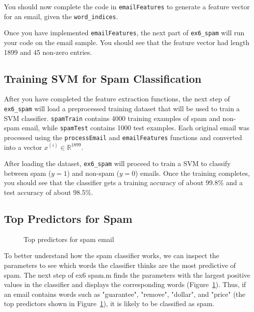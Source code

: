 \documentclass[12pt]{article}
\begin{document}
You should now complete the code in \texttt{emailFeatures} to generate a feature vector for an email, given the \texttt{word\_indices}.

Once you have implemented \texttt{emailFeatures}, the next part of \texttt{ex6\_spam} will run your code on the email sample. You should see that the feature vector had length 1899 and 45 non-zero entries.

\subsection{Training SVM for Spam Classification}

After you have completed the feature extraction functions, the next step of \texttt{ex6\_spam} will load a preprocessed training dataset that will be used to train a SVM classifier. \texttt{spamTrain} contains 4000 training examples of spam and non-spam email, while \texttt{spamTest} contains 1000 test examples. Each original email was processed using the \texttt{processEmail} and \texttt{emailFeatures} functions and converted into a vector $x^{(i)} \in \mathbb{R}^{1899}$.

After loading the dataset, \texttt{ex6\_spam} will proceed to train a SVM to classify between spam ($y = 1$) and non-spam ($y = 0$) emails. Once the training completes, you should see that the classifier gets a training accuracy of about 99.8\% and a test accuracy of about 98.5\%.

\subsection{Top Predictors for Spam}


\begin{figure}[h!]
  
  \caption{Top predictors for spam email}
  \label{block:predictors}
  \end{figure}

  To better understand how the spam classifier works, we can inspect the parameters to see which words the classifier thinks are the most predictive of spam. The next step of ex6 spam.m finds the parameters with the largest positive values in the classifier and displays the corresponding words (Figure~\ref{block:predictors}). Thus, if an email contains words such as "guarantee", "remove", "dollar", and "price" (the top predictors shown in Figure~\ref{block:predictors}), it is likely to be classified as spam.
\end{document}
